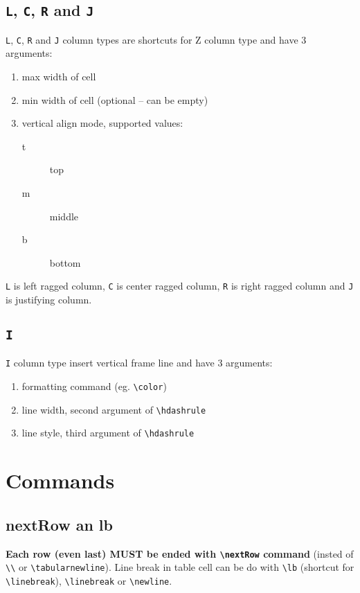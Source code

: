 \documentclass[a4paper]{article}
\begin{document}
\subsection{\texttt{L}, \texttt{C}, \texttt{R} and \texttt{J}}

\texttt{L}, \texttt{C}, \texttt{R} and \texttt{J} column types are shortcuts for Z column type and have 3 arguments:
\begin{enumerate}
  \item max width of cell
  \item min width of cell (optional – can be empty)
  \item vertical align mode, supported values:
    \begin{description}
      \item[t] top
      \item[m] middle
      \item[b] bottom
    \end{description}
\end{enumerate}
\texttt{L} is left ragged column, \texttt{C} is center ragged column, \texttt{R} is right ragged column and \texttt{J} is justifying column.

\subsection{\texttt{I}}

\texttt{I} column type insert vertical frame line and have 3 arguments:
\begin{enumerate}
  \item formatting command (eg. \Verb$\color$)
  \item line width, second argument of \Verb$\hdashrule$
  \item line style, third argument of \Verb$\hdashrule$
\end{enumerate}


\section{Commands}

\subsection{nextRow an lb}
{\bfseries Each row (even last) MUST be ended with \Verb$\nextRow$ command} (insted of \Verb$\\$ or \Verb$\tabularnewline$).
Line break in table cell can be do with \Verb$\lb$ (shortcut for \Verb$\linebreak$), \Verb$\linebreak$ or \Verb$\newline$.
\end{document}
